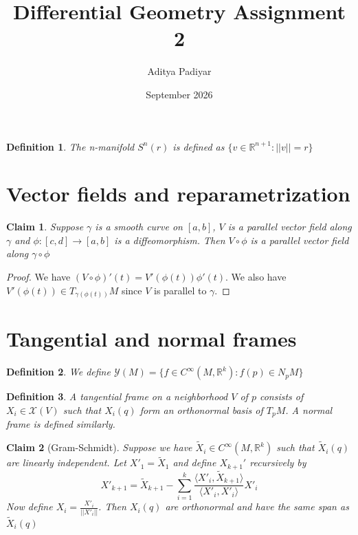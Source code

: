 \documentclass{article}
\title{Differential Geometry Assignment 2}
\author{Aditya Padiyar}
\date{September 2026}
\newtheorem{claim}{Claim}
\newtheorem{definition}{Definition}
\begin{document}
\maketitle

\begin{definition}
  The n-manifold $S^n(r)$ is defined as $\{v \in \mathbb{R}^{n+1}:||v||=r\}$
\end{definition}

\section{Vector fields and reparametrization}

\begin{claim}
Suppose $\gamma$ is a smooth curve on $[a,b]$, $V$ is a parallel vector field along $\gamma$ and $\phi:[c,d] \to [a,b]$ is a diffeomorphism.
Then $V \circ \phi$ is a parallel vector field along $\gamma \circ \phi$
\end{claim}

\begin{proof}
  We have $(V \circ \phi)'(t)=V'(\phi(t))\phi'(t)$. We also have $V'(\phi(t)) \in T_{\gamma(\phi(t))}M$ since $V$ is parallel to $\gamma$.
\end{proof}

\section{Tangential and normal frames}

\begin{definition}
  We define $\mathcal{Y}(M)=\{f \in C^\infty(M,\mathbb{R}^k):f(p) \in N_pM\}$ 
\end{definition}

\begin{definition}
  A tangential frame on a neighborhood $V$ of $p$ consists of $X_i \in \mathcal{X}(V)$ such that 
  $X_i(q)$ form an orthonormal basis of $T_pM$. A normal frame is defined similarly.
\end{definition}

\begin{claim}[Gram-Schmidt]
  Suppose we have $\tilde{X}_i \in C^\infty(M,\mathbb{R}^k)$ such that $\tilde{X}_i(q)$ are linearly independent. 
  Let $X'_1 = \tilde{X}_1$ and define $X_{k+1}'$ recursively by \[ X'_{k+1} = \tilde{X}_{k+1} - \sum_{i=1}^k \frac{ \langle X'_i, \tilde{X}_{k+1} \rangle } { \langle X'_i , X'_i \rangle } X'_i \]
  Now define $X_i = \frac{X'_{i}}{||X'_i||}$. Then $X_i(q)$ are orthonormal and have the same span as $\tilde{X}_i(q)$
\end{claim}
\end{document}
